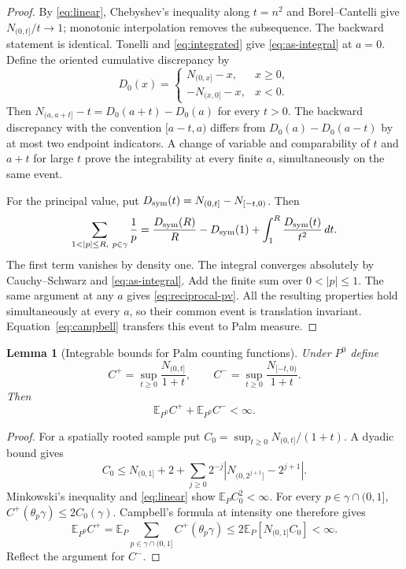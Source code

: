 \documentclass[11pt,reqno]{amsart}
\numberwithin{equation}{section}
\newtheorem{lemma}[theorem]{Lemma}
\theoremstyle{definition}
\theoremstyle{remark}
\newcommand{\E}{\mathbb E}
\newcommand{\1}{\mathbf 1}
\newcommand{\dd}{\,d}
\newcommand{\abs}[1]{\left\lvert #1\right\rvert}
\begin{document}
\begin{proof}
By \eqref{eq:linear}, Chebyshev's inequality along $t=n^2$ and
Borel--Cantelli give $N_{(0,t]}/t\to1$; monotonic interpolation removes
the subsequence. The backward statement is identical.
Tonelli and \eqref{eq:integrated} give \eqref{eq:as-integral} at $a=0$.
Define the oriented cumulative discrepancy by
\begin{equation}\label{eq:oriented-discrepancy}
D_0(x)=
\begin{cases}
N_{(0,x]}-x,&x\ge0,\\
-N_{(x,0]}-x,&x<0.
\end{cases}
\end{equation}
Then $N_{(a,a+t]}-t=D_0(a+t)-D_0(a)$ for every $t>0$.
The backward discrepancy with the convention $[a-t,a)$ differs from
$D_0(a)-D_0(a-t)$ by at most two endpoint indicators. A change of
variable and comparability of $t$ and $a+t$ for large $t$ prove the
integrability at every finite $a$, simultaneously on the same event.

For the principal value, put
$D_{\rm sym}(t)=N_{(0,t]}-N_{[-t,0)}$. Then
\[
\sum_{1<|p|\le R,\ p\in\gamma}\frac1p
=\frac{D_{\rm sym}(R)}R-D_{\rm sym}(1)
  +\int_1^R\frac{D_{\rm sym}(t)}{t^2}\dd t.
\]
The first term vanishes by density one. The integral converges
absolutely by Cauchy--Schwarz and \eqref{eq:as-integral}. Add the finite
sum over $0<|p|\le1$. The same argument at any $a$ gives
\eqref{eq:reciprocal-pv}. All the resulting properties hold simultaneously
at every $a$, so their common event is translation invariant.
Equation~\eqref{eq:campbell} transfers this event to Palm measure.
\end{proof}

\begin{samepage}
\begin{lemma}[Integrable bounds for Palm counting functions]\label{lem:palm-envelope}
Under $P^0$ define
\[
C^+=\sup_{t\ge0}\frac{N_{(0,t]}}{1+t},\qquad
C^-=\sup_{t\ge0}\frac{N_{[-t,0)}}{1+t}.
\]
Then
\begin{equation}\label{eq:palm-envelope-integrability}
\E_{P^0}C^++\E_{P^0}C^-<\infty.
\end{equation}
\end{lemma}
\end{samepage}

\begin{proof}
For a spatially rooted sample put
$C_0=\sup_{t\ge0}N_{(0,t]}/(1+t)$.
A dyadic bound gives
\[
C_0\le N_{(0,1]}+2+
 \sum_{j\ge0}2^{-j}
 \abs{N_{(0,2^{j+1}]}-2^{j+1}}.
\]
Minkowski's inequality and \eqref{eq:linear} show
$\E_PC_0^2<\infty$. For every $p\in\gamma\cap(0,1]$,
$C^+(\theta_p\gamma)\le2C_0(\gamma)$.
Campbell's formula at intensity one therefore gives
\[
\E_{P^0}C^+
=\E_P\sum_{p\in\gamma\cap(0,1]}C^+(\theta_p\gamma)
\le2\E_P[N_{(0,1]}C_0]<\infty.
\]
Reflect the argument for $C^-$.
\end{proof}
\end{document}
